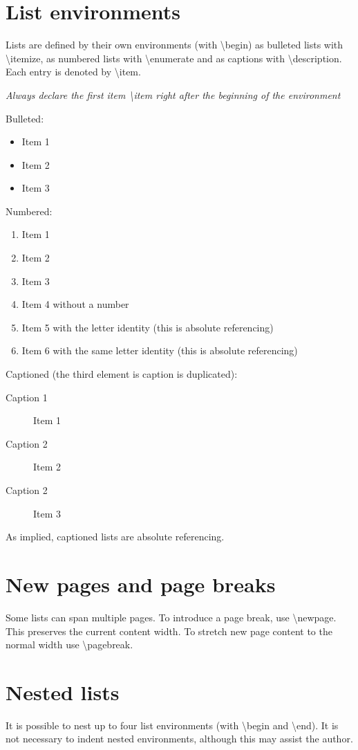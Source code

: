 \documentclass{sample}
\begin{document}
\section{List environments}
Lists are defined by their own environments (with \textbackslash begin) as bulleted lists with \textbackslash itemize, as numbered lists with \textbackslash enumerate and as captions with \textbackslash description. Each entry is denoted by \textbackslash item.

\emph{Always declare the first item \textbackslash item right after the beginning of the environment} 

Bulleted:
\begin{itemize}
\item Item 1
\item Item 2
\item Item 3
\end{itemize}

Numbered:
\begin{enumerate}
\item Item 1
\item Item 2
\item Item 3
\item[] Item 4 without a number
\item[a] Item 5 with the letter identity (this is absolute referencing)
\item[a] Item 6 with the same letter identity (this is absolute referencing)
\end{enumerate}

Captioned (the third element is caption is duplicated):
\begin{description}
\item[Caption 1] Item 1
\item[Caption 2] Item 2
\item[Caption 2] Item 3
\end{description}

As implied, captioned lists are absolute referencing.

\section{New pages and page breaks}
Some lists can span multiple pages. To introduce a page break, use \textbackslash newpage. This preserves the current content width. To stretch new page content to the normal width use \textbackslash pagebreak.
\newpage

\section{Nested lists}
It is possible to nest up to four list environments (with \textbackslash begin and  \textbackslash end). It is not necessary to indent nested environments, although this may assist the author.
\end{document}
